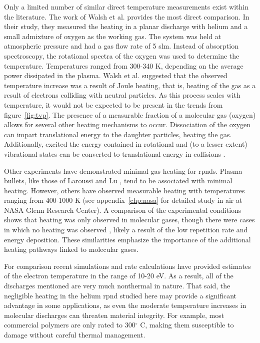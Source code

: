 Only a limited number of similar direct temperature measurements exist within
the literature. The work of Walsh et al. \cite{Walsh2010} provides the most
direct comparison. In their study, they measured the heating in a planar
discharge with helium and a small admixture of oxygen as the working gas. The
system was held at atmospheric pressure and had a gas flow rate of 5 slm.
Instead of absorption spectroscopy, the rotational spectra of the oxygen was
used to determine the temperature. Temperatures ranged from 300-340 K, depending
on the average power dissipated in the plasma. Walsh et al. suggested that the
observed temperature increase was a result of Joule heating, that is, heating of
the gas as a result of electrons colliding with neutral particles. As this
process scales with temperature, it would not be expected to be present in the
trends from figure~\ref{fig:tvp}. The presence of a measurable fraction of a
molecular gas (oxygen) allows for several other heating mechanisms to occur.
Dissociation of the oxygen can impart translational energy to the daughter
particles, heating the gas. Additionally, excited the energy contained in
rotational and (to a lesser extent) vibrational states can be converted to
translational energy in collisions \cite{Kiehlbauch2003}.

Other experiments have demonstrated minimal gas heating for \acs{rpnd}s. Plasma
bullets, like those of Laroussi and Lu \cite{Laroussi2005, Lu2006}, tend to be
associated with minimal heating. However, others have observed measurable
heating with temperatures ranging from 400-1000 K \cite{Pai2009, Popov2011,
Zuzeek2010, Aleksandrov2010} (see appendix~\ref{chp:nasa} for detailed study in
air at NASA Glenn Research Center). A comparison of the experimental conditions
shows that heating was only observed in molecular gases, though there were cases
in which no heating was observed \cite{Pancheshnyi2000}, likely a result of the
low repetition rate and energy deposition. These similarities emphasize the
importance of the additional heating pathways linked to molecular gases.

For comparison recent simulations and rate calculations \cite{Takashima2011,
Aleksandrov2007} have provided estimates of the electron temperature in the
range of 10-20 eV. As a result, all of the discharges mentioned are very much
nonthermal in nature. That said, the negligible heating in the helium \acs{rpnd}
studied here may provide a significant advantage in some applications, as even
the moderate temperature increases in molecular discharges can threaten material
integrity. For example, most commercial polymers are only rated to 300$^\circ$
C, making them susceptible to damage without careful thermal management.

